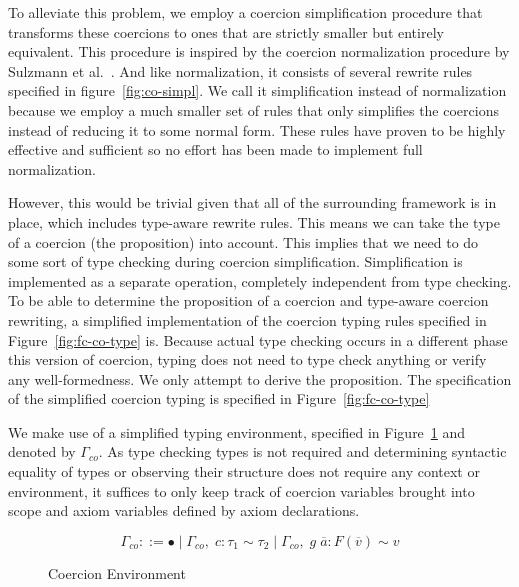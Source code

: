 To alleviate this problem, we employ a coercion simplification procedure that
transforms these coercions to ones that are strictly smaller but entirely
equivalent. This procedure is inspired by the coercion normalization procedure
by Sulzmann et al.~\cite{Sulzmann:2007:SFT:1190315.1190324}. And like
normalization, it consists of several rewrite rules specified in
figure~\ref{fig:co-simpl}. We call it simplification instead of normalization
because we employ a much smaller set of rules that only simplifies the coercions
instead of reducing it to some normal form. These rules have proven to be highly
effective and sufficient so no effort has been made to implement full
normalization.

However, this would be trivial given that all of the surrounding framework is in
place, which includes type-aware rewrite rules. This means we can take the type
of a coercion (the proposition) into account. This implies that we need to do
some sort of type checking during coercion simplification.  Simplification is
implemented as a separate operation, completely independent from type checking.
To be able to determine the proposition of a coercion and type-aware coercion
rewriting, a simplified implementation of the coercion typing rules specified in
Figure~\ref{fig:fc-co-type} is. Because actual type checking occurs in a
different phase this version of coercion, typing does not need to type check
anything or verify any well-formedness. We only attempt to derive the
proposition. The specification of the simplified coercion typing is specified in
Figure~\ref{fig:fc-co-type}

We make use of a simplified typing environment, specified in
Figure~\ref{fig:co-env} and denoted by $\Gamma_{co}$. As type checking types is
not required and determining syntactic equality of types or observing their
structure does not require any context or environment, it suffices to only keep
track of coercion variables brought into scope and axiom variables defined by
axiom declarations.

\begin{figure}
\[
\Gamma_{co} ::= \bullet \mid \Gamma_{co}, \; c : \tau_1 \sim \tau_2 \mid
\Gamma_{co}, \; g \; \overline{a} : F(\overline{v}) \sim v
\]
\caption{Coercion Environment}
\label{fig:co-env}
\end{figure}
